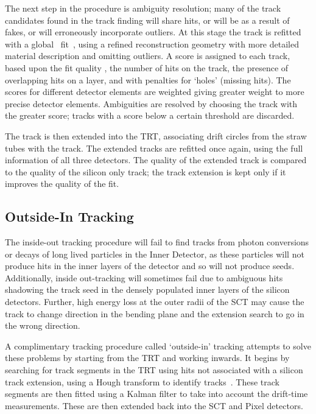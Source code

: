 The next step in the procedure is ambiguity resolution; many of the track
candidates found in the track finding will share hits, or will be as a result of
fakes, or will erroneously incorporate outliers. At this stage the track is
refitted with a global \chisquared\ fit~\cite{1742-6596-119-3-032013}, using a
refined reconstruction geometry with more detailed material description and
omitting outliers.  A score is assigned to each track, based upon the fit
quality \chisquaredndof, the number of hits on the track, the presence of
overlapping hits on a layer, and with penalties for `holes' (missing hits). The
scores for different detector elements are weighted giving greater weight to
more precise detector elements. Ambiguities are resolved by choosing the track
with the greater score; tracks with a score below a certain threshold are
discarded.

The track is then extended into the TRT, associating drift circles from the
straw tubes with the track. The extended tracks are refitted once again, using
the full information of all three detectors. The quality of the extended track
is compared to the quality of the silicon only track; the track extension is
kept only if it improves the quality of the fit.

\subsection{Outside-In Tracking}

The inside-out tracking procedure will fail to find tracks from photon
conversions or decays of long lived particles in the Inner Detector, as these
particles will not produce hits in the inner layers of the detector and so will not produce seeds. Additionally, inside out-tracking will sometimes
fail due to ambiguous hits shadowing the track seed in the densely populated
inner layers of the silicon detectors. Further, high energy loss at the outer
radii of the SCT may cause the track to change direction in the bending plane
and the extension search to go in the wrong direction. 

A complimentary tracking procedure called `outside-in' tracking attempts to
solve these problems by starting from the TRT and working inwards. It begins by
searching for track segments in the TRT using hits not associated with a silicon
track extension, using a Hough transform to identify
tracks~\cite{Baines:683897}. These track segments are then fitted using a Kalman
filter to take into account the drift-time measurements. These are then extended
back into the SCT and Pixel detectors.
